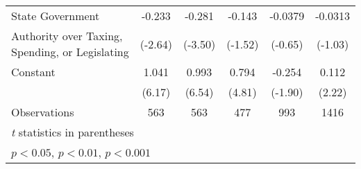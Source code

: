 {\begin{tabular}{l*{5}{c}}
\addlinespace
State Government&   -0.233\sym{**} &   -0.281\sym{***}&   -0.143         &  -0.0379         &  -0.0313         \\
Authority over Taxing, Spending, or Legislating&  (-2.64)         &  (-3.50)         &  (-1.52)         &  (-0.65)         &  (-1.03)         \\
\addlinespace
Constant        &    1.041\sym{***}&    0.993\sym{***}&    0.794\sym{***}&   -0.254         &    0.112\sym{*}  \\
                &   (6.17)         &   (6.54)         &   (4.81)         &  (-1.90)         &   (2.22)         \\
\midrule
Observations    &      563         &      563         &      477         &      993         &     1416         \\
\bottomrule
\multicolumn{6}{l}{\footnotesize \textit{t} statistics in parentheses}\\
\multicolumn{6}{l}{\footnotesize \sym{*} \(p<0.05\), \sym{**} \(p<0.01\), \sym{***} \(p<0.001\)}\\
\end{tabular}
}
